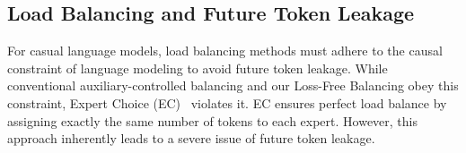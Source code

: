 \documentclass{article} %
\newcommand{\ours}{Loss-Free Balancing}
\begin{document}


\subsection{Load Balancing and Future Token Leakage}
\label{EC_discussion}

For casual language models, load balancing methods must adhere to the causal constraint of language modeling to avoid future token leakage. While conventional auxiliary-controlled balancing and our \ours{} obey this constraint, Expert Choice (EC)~\citep{Zhou2022MixtureofExpertsWE} violates it. EC ensures perfect load balance by assigning exactly the same number of tokens to each expert. However, this approach inherently leads to a severe issue of future token leakage.
\end{document}

